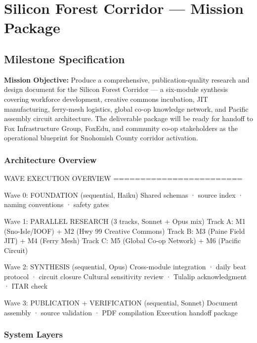 \documentclass[11pt,letterpaper]{article}
\newcommand{\stageheader}[2]{%
  \noindent\colorbox{#2}{\makebox[\textwidth][l]{%
    \textcolor{white}{\bfseries\sffamily\hspace{6pt}#1\hspace{6pt}}}}%
  \vspace{0.5em}\par%
}
\begin{document}
\newpage

\stageheader{STAGE 3 --- MISSION PACKAGE}{tertiary}

\section{Silicon Forest Corridor --- Mission Package}

\subsection{Milestone Specification}

\textbf{Mission Objective:} Produce a comprehensive, publication-quality research and design document for the Silicon Forest Corridor --- a six-module synthesis covering workforce development, creative commons incubation, JIT manufacturing, ferry-mesh logistics, global co-op knowledge network, and Pacific assembly circuit architecture. The deliverable package will be ready for handoff to Fox Infrastructure Group, FoxEdu, and community co-op stakeholders as the operational blueprint for Snohomish County corridor activation.

\subsubsection{Architecture Overview}

\begin{asciibox}
WAVE EXECUTION OVERVIEW
========================

Wave 0: FOUNDATION (sequential, Haiku)
  Shared schemas · source index · naming conventions · safety gates

Wave 1: PARALLEL RESEARCH (3 tracks, Sonnet + Opus mix)
  Track A: M1 (Sno-Isle/IOOF) + M2 (Hwy 99 Creative Commons)
  Track B: M3 (Paine Field JIT) + M4 (Ferry Mesh)
  Track C: M5 (Global Co-op Network) + M6 (Pacific Circuit)

Wave 2: SYNTHESIS (sequential, Opus)
  Cross-module integration · daily beat protocol · circuit closure
  Cultural sensitivity review · Tulalip acknowledgment · ITAR check

Wave 3: PUBLICATION + VERIFICATION (sequential, Sonnet)
  Document assembly · source validation · PDF compilation
  Execution handoff package
\end{asciibox}

\subsubsection{System Layers}
\end{document}
